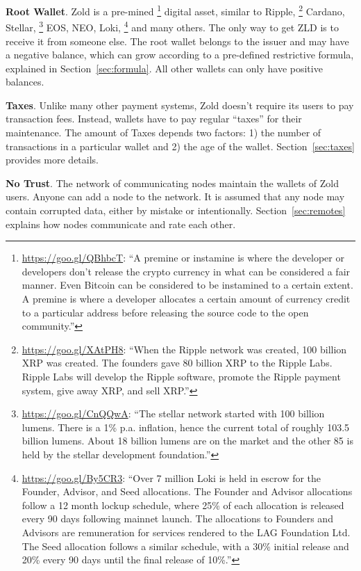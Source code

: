 \documentclass{main}
\begin{document}
\textbf{Root Wallet}.
Zold is a pre-mined%
\footnote{%
  \url{https://goo.gl/QBhbcT}:
  ``A premine or instamine is where the developer or developers don't release
  the crypto currency in what can be considered a fair manner.
  Even Bitcoin can be considered to be instamined to a certain extent.
  A premine is where a developer allocates a certain amount of currency
  credit to a particular address before releasing the source
  code to the open community.''
}
digital asset, similar to Ripple,%
\footnote{%
  \url{https://goo.gl/XAtPH8}:
  ``When the Ripple network was created, 100 billion XRP was created.
  The founders gave 80 billion XRP to the Ripple Labs. Ripple Labs
  will develop the Ripple software, promote the Ripple payment system,
  give away XRP, and sell XRP.''
}
Cardano,
Stellar,%
\footnote{%
  \url{https://goo.gl/CnQQwA}:
  ``The stellar network started with 100 billion lumens.
  There is a 1\% p.a. inflation, hence the current total of roughly 103.5 billion lumens.
  About 18 billion lumens are on the market and the other
  85 is held by the stellar development foundation.''
}
EOS, NEO, Loki,%
\footnote{%
  \url{https://goo.gl/By5CR3}:
  ``Over 7 million Loki is held in escrow for the Founder,
  Advisor, and Seed allocations. The Founder and Advisor allocations
  follow a 12 month lockup schedule, where 25\% of each allocation is
  released every 90 days following mainnet launch. The allocations
  to Founders and Advisors are remuneration for services rendered to the
  LAG Foundation Ltd. The Seed allocation follows a similar schedule, with a
  30\% initial release and 20\% every 90 days until the final release of 10\%.''
}
and many others.
The only way to get ZLD is to receive it from someone else.
The root wallet belongs to the issuer and may have a negative balance,
which can grow according to a pre-defined restrictive formula, explained in Section~\ref{sec:formula}.
All other wallets can only have positive balances.

\textbf{Taxes}.
Unlike many other payment systems, Zold doesn't require its users
to pay transaction fees. Instead, wallets have to pay regular ``taxes'' for their maintenance.
The amount of Taxes depends two factors: 1) the number
of transactions in a particular wallet and 2) the age of the wallet.
Section~\ref{sec:taxes} provides more details.

\textbf{No Trust}.
The network of communicating nodes maintain the wallets of Zold users.
Anyone can add a node to the network.
It is assumed that any node may contain corrupted data, either by mistake or intentionally.
Section~\ref{sec:remotes} explains how nodes communicate and rate each other.
\end{document}
